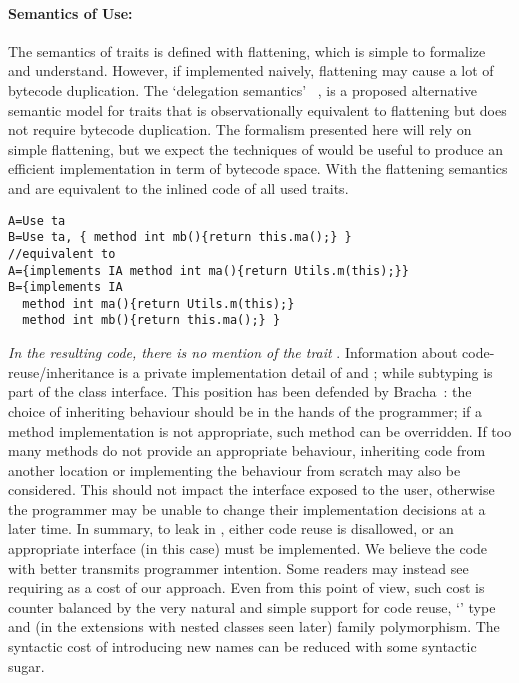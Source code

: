 \paragraph{Semantics of Use:}
The semantics of traits is defined with flattening, which is 
simple to formalize and understand.
However, if implemented naively, flattening may cause a lot of
bytecode duplication.
The `delegation semantics'%
~\cite{lagorio2009featherweight},
is a proposed alternative semantic model for traits
that is observationally equivalent to flattening but does not require
bytecode duplication. The formalism presented here will rely on simple
flattening, but we expect the techniques of
\cite{lagorio2009featherweight} would be useful to produce an
efficient implementation in term of bytecode space. 
With the flattening semantics
 \Q@A@ and \Q@B@ are equivalent to the inlined code of all used traits{.}%
\begin{lstlisting}
A=Use ta
B=Use ta, { method int mb(){return this.ma();} }
//equivalent to
A={implements IA method int ma(){return Utils.m(this);}}
B={implements IA
  method int ma(){return Utils.m(this);}
  method int mb(){return this.ma();} } 
 \end{lstlisting}

\emph{In the resulting code, there is no mention of the trait
 \Q@ta@}. Information about code-reuse/inheritance
  is a private implementation detail of \Q@A@
 and \Q@B@; while subtyping is part of the class interface.%
This position has been defended by 
Bracha~\cite{bracha1992programming}:
the choice of inheriting behaviour %
should be in the hands of the programmer; if a method implementation is not appropriate, such method can be
overridden. If too many methods do not provide an appropriate behaviour, inheriting code from another location or implementing the behaviour from scratch may also be considered.
This should not impact the interface exposed to the user, otherwise the programmer may be unable to change their implementation decisions at a later time.
%
In summary, to leak \Q@this@ in \name, either code reuse is disallowed, or an appropriate interface (\Q@IA@ in this case) must be implemented.
We believe the code with \Q@IA@ better transmits programmer intention. Some
readers may instead see requiring \Q@IA@ as a cost of our approach.
Even from this point of view, such cost is counter balanced by 
the very natural and simple support for code reuse, `\Q@This@' type and (in the extensions with nested classes seen later)
family polymorphism.
The syntactic cost of introducing new names can be reduced
with some syntactic sugar. %






